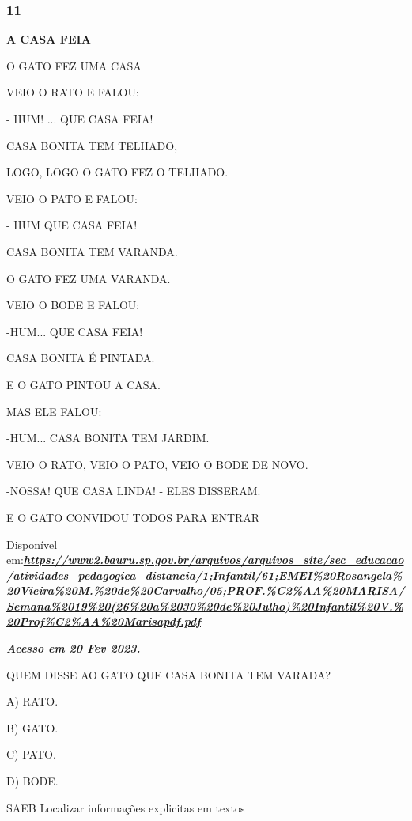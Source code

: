 \subsubsection{11}\label{section-51}

\textbf{A CASA FEIA}

O GATO FEZ UMA CASA

VEIO O RATO E FALOU:

- HUM! ... QUE CASA FEIA!

CASA BONITA TEM TELHADO,

LOGO, LOGO O GATO FEZ O TELHADO.

VEIO O PATO E FALOU:

- HUM QUE CASA FEIA!

CASA BONITA TEM VARANDA.

O GATO FEZ UMA VARANDA.

VEIO O BODE E FALOU:

-HUM... QUE CASA FEIA!

CASA BONITA É PINTADA.

E O GATO PINTOU A CASA.

MAS ELE FALOU:

-HUM... CASA BONITA TEM JARDIM.

VEIO O RATO, VEIO O PATO, VEIO O BODE DE NOVO.

-NOSSA! QUE CASA LINDA! - ELES DISSERAM.

E O GATO CONVIDOU TODOS PARA ENTRAR

Disponível
em:\href{https://www2.bauru.sp.gov.br/arquivos/arquivos_site/sec_educacao/atividades_pedagogica_distancia/1;Infantil/61;EMEI\%20Rosangela\%20Vieira\%20M.\%20de\%20Carvalho/05;PROF.\%C2\%AA\%20MARISA/Semana\%2019\%20(26\%20a\%2030\%20de\%20Julho)\%20Infantil\%20V.\%20Prof\%C2\%AA\%20Marisapdf.pdf}{\textbf{\emph{https://www2.bauru.sp.gov.br/arquivos/arquivos\_site/sec\_educacao/atividades\_pedagogica\_distancia/1;Infantil/61;EMEI\%20Rosangela\%20Vieira\%20M.\%20de\%20Carvalho/05;PROF.\%C2\%AA\%20MARISA/Semana\%2019\%20(26\%20a\%2030\%20de\%20Julho)\%20Infantil\%20V.\%20Prof\%C2\%AA\%20Marisapdf.pdf}}}

\textbf{\emph{Acesso em 20 Fev 2023.}}

QUEM DISSE AO GATO QUE CASA BONITA TEM VARADA?

A) RATO.

B) GATO.

C) PATO.

D) BODE.

\protect\hypertarget{_heading=h.28h4qwu}{}{}SAEB Localizar informações
explicitas em textos

